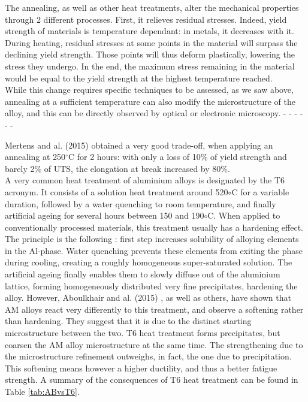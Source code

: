 The annealing, as well as other heat treatments, alter the mechanical properties through 2 different processes. First, it relieves residual stresses. Indeed, yield strength of materials is temperature dependant: in metals, it decreases with it. During heating, residual stresses at some points in the material will surpass the declining yield strength. Those points will thus deform plastically, lowering the stress they undergo. In the end, the maximum stress remaining in the material would be equal to the yield strength at the highest temperature reached.\\

While this change requires specific techniques to be assessed, as we saw above, annealing at a sufficient temperature can also modify the microstructure of the alloy, and this can be directly observed by optical or electronic microscopy. - - - - - -

Mertens and al. (2015)\cite{Mertens15} obtained a very good trade-off, when applying an annealing at 250$^\circ$C for 2 hours: with only a loss of 10\% of yield strength and barely 2\% of UTS, the elongation at break increased by 80\%. \\

A very common heat treatment of aluminium alloys is designated by the T6 acronym. It consists of a solution heat treatment around 520$\circ$C for a variable duration, followed by a water quenching to room temperature, and finally artificial ageing for several hours between 150 and 190$\circ$C. When applied to conventionally processed materials, this treatment usually has a hardening effect. The principle is the following \cite{T6}: first step increases solubility of alloying elements in the Al-phase. Water quenching prevents these elements from exiting the phase during cooling, creating a roughly homogeneous super-saturated solution. The artificial ageing finally enables them to slowly diffuse out of the aluminium lattice, forming homogeneously distributed very fine precipitates, hardening the alloy. However, Aboulkhair and al. (2015) \cite{aboulkhair2015}, as well as others, have shown that AM alloys react very differently to this treatment, and observe a softening rather than hardening. They suggest that it is due to the distinct starting microstructure between the two. T6 heat treatment forms precipitates, but coarsen the AM alloy microstructure at the same time. The strengthening due to the microstructure refinement outweighs, in fact, the one due to precipitation. This softening means however a higher ductility, and thus a better fatigue strength. A summary of the consequences of T6 heat treatment can be found in Table \ref{tab:ABvsT6}. \\

